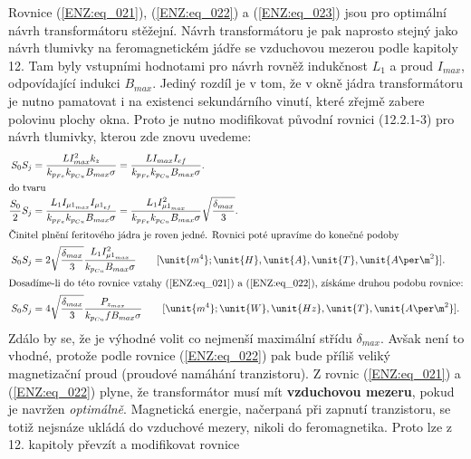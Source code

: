     Rovnice (\ref{ENZ:eq_021}), (\ref{ENZ:eq_022}) a (\ref{ENZ:eq_023}) jsou pro optimální návrh 
    transformátoru stěžejní. Návrh transformátoru je pak naprosto stejný jako návrh tlumivky 
    na feromagnetickém jádře se vzduchovou mezerou podle kapitoly 12. Tam byly vstupními 
    hodnotami pro návrh rovněž indukčnost \(L_1\) a proud \(I_{max}\), odpovídající indukci 
    \(B_{max}\). Jediný rozdíl je v tom, že v okně jádra transformátoru je nutno pamatovat i na 
    existenci sekundárního vinutí, které zřejmě zabere polovinu plochy okna. Proto je nutno 
    modifikovat původní rovnici (12.2.1-3) pro návrh tlumivky, kterou zde znovu uvedeme:
    \begin{align}
      S_0S_j &= \frac{LI_{max}^2k_z}{k_{p_{Fe}}k_{p_{Cu}}B_{max}\sigma} 
             =  \frac{LI_{max}I_{ef}}{k_{p_{Fe}}k_{p_{Cu}}B_{max}\sigma}. \label{ENZ:eq_024}  \\
      \shortintertext{do tvaru}
      \frac{S_0}{2}S_j 
             &= \frac{L_1I_{{\mu1}_{max}}I_{{\mu1}_{ef}}}{k_{p_{Fe}}k_{p_{Cu}}B_{max}\sigma}
              = \frac{L_1I_{{\mu1}_{max}}^2}{k_{p_{Fe}}k_{p_{Cu}}B_{max}\sigma}
                \sqrt{\frac{\delta_{max}}{3}}.                           \label{ENZ:eq_025}  \\
      \shortintertext{Činitel plnění feritového jádra je roven jedné. Rovnici poté upravíme do 
                      konečné podoby}
      S_0S_j &=2\sqrt{\frac{\delta_{max}}{3}} 
                \frac{L_1I_{{\mu1}_{max}}^2}{k_{p_{Cu}}B_{max}\sigma}
                \qquad [\unit{m^4};\unit{H},\unit{A},\unit{T},\unit{A\per\m^2}].   \label{ENZ:eq_026}  \\
      \shortintertext{Dosadíme-li do této rovnice vztahy (\ref{ENZ:eq_021}) a (\ref{ENZ:eq_022}), 
                      získáme druhou podobu rovnice:}
      S_0S_j &=4\sqrt{\frac{\delta_{max}}{3}} 
                \frac{P_{z_{max}}}{k_{p_{Cu}}fB_{max}\sigma}
                \qquad [\unit{m^4};\unit{W},\unit{Hz},\unit{T},\unit{A\per\m^2}].  \label{ENZ:eq_027}
    \end{align}
    Zdálo by se, že je výhodné volit co nejmenší maximální střídu \(\delta_{max}\). Avšak není to 
    vhodné, protože podle rovnice (\ref{ENZ:eq_022}) pak bude příliš veliký magnetizační proud 
    (proudové namáhání tranzistoru). Z rovnic (\ref{ENZ:eq_021}) a (\ref{ENZ:eq_022}) plyne, že 
    transformátor musí mít \textbf{vzduchovou mezeru}, pokud je navržen \emph{optimálně}. 
    Magnetická energie, načerpaná při zapnutí tranzistoru, se totiž nejsnáze ukládá do vzduchové 
    mezery, nikoli do feromagnetika. Proto lze z 12. kapitoly převzít a modifikovat rovnice 
